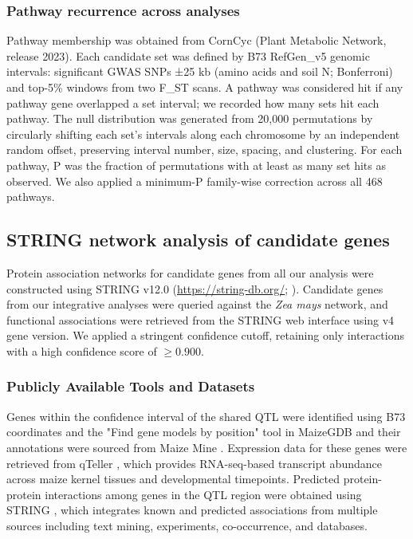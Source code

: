 \subsubsection{Pathway recurrence across analyses}
Pathway membership was obtained from CornCyc (Plant Metabolic Network, release 2023). Each candidate set was defined by B73 RefGen\_v5 genomic intervals: significant GWAS SNPs ±25 kb (amino acids and soil N; Bonferroni) and top-5\% windows from two F\_ST scans. A pathway was considered hit if any pathway gene overlapped a set interval; we recorded how many sets hit each pathway. The null distribution was generated from 20,000 permutations by circularly shifting each set’s intervals along each chromosome by an independent random offset, preserving interval number, size, spacing, and clustering. For each pathway, P was the fraction of permutations with at least as many set hits as observed. We also applied a minimum-P family-wise correction across all 468 pathways.

\subsection{STRING network analysis of candidate genes}

Protein association networks for candidate genes from all our analysis were constructed using STRING v12.0 (\url{https://string-db.org/}; \citealp{Szklarczyk2023STRING}). Candidate genes from our integrative analyses were queried against the \textit{Zea mays} network, and functional associations were retrieved from the STRING web interface using v4 gene version. We applied a stringent confidence cutoff, retaining only interactions with a high confidence score of $\geq 0.900$. 


\subsubsection{Publicly Available Tools and Datasets}
Genes within the confidence interval of the shared QTL were identified using B73 coordinates and the "Find gene models by position" tool in MaizeGDB \citep{MaizeGDB} and their annotations were sourced from Maize Mine \citep{maizemine}. Expression data for these genes were retrieved from qTeller \citep{qteller}, which provides RNA-seq-based transcript abundance across maize kernel tissues and developmental timepoints. Predicted protein-protein interactions among genes in the QTL region were obtained using STRING \citep{STRING}, which integrates known and predicted associations from multiple sources including text mining, experiments, co-occurrence, and databases.

